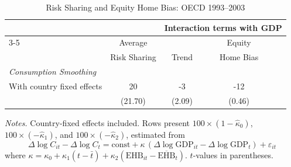\begin{table}[htbp]
\centering
\caption{Risk Sharing and Equity Home Bias: OECD 1993--2003}
\label{tab:table5_cons}
\begin{tabular}{lcccc}
\toprule
 & & \multicolumn{3}{c}{Interaction terms with GDP} \\
\cmidrule(lr){3-5}
 & Average & & Equity \\
 & Risk Sharing & Trend & Home Bias \\
\midrule
\textit{Consumption Smoothing} & & & \\[4pt]
\quad With country fixed effects
  & 20   & -3   & -12   \\
  & (21.70)   & (2.09)   & (0.46)   \\[4pt]
\bottomrule
\end{tabular}
\begin{minipage}{\linewidth}
\smallskip
\footnotesize
\textit{Notes.} Country-fixed effects included. Rows present $100 \times (1 - \hat{\kappa}_0)$,
$100 \times (-\hat{\kappa}_1)$, and $100 \times (-\hat{\kappa}_2)$, estimated from
$$\Delta \log C_{it} - \Delta \log C_t = \text{const} + \kappa\,(\Delta \log
\text{GDP}_{it} - \Delta \log \text{GDP}_t) + \varepsilon_{it}$$
where $\kappa = \kappa_0 + \kappa_1(t - \bar{t}) + \kappa_2(\text{EHB}_{it} -
\overline{\text{EHB}}_t)$. $t$-values in parentheses.
\end{minipage}
\end{table}
